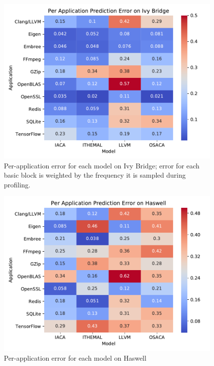 \begin{figure} \includegraphics[width=\columnwidth]{figures/ivb-app-err.pdf} \caption{Per-application error for each model on Ivy Bridge;
error for each basic block is weighted by the frequency it is sampled during profiling.}
\label{fig:ivb-app-err}
\end{figure}

\begin{figure}
\includegraphics[width=\columnwidth]{figures/hsw-app-err.pdf}
\caption{Per-application error for each model on Haswell}
\label{fig:hsw-app-err}
\end{figure}

